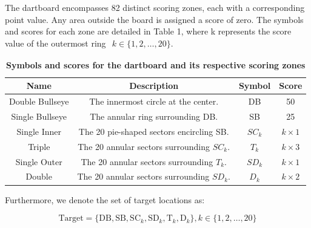 \documentclass[cjjs]{ipart}
\theoremstyle{plain}
\begin{document}
The dartboard encompasses 82 distinct scoring zones, each with a corresponding point value. Any area outside the board is assigned a score of zero. The symbols and scores for each zone are detailed in Table 1, where k represents the score value of the outermost ring $\begin{aligned}k \in \{1, 2, \dots, 20\}.\end{aligned}$
\begin{table}[h]
    \centering
    \begin{tabular}{|c|c|c|c|}
        \hline
        Name & Description & Symbol & Score \\
        \hline
        Double Bullseye & The innermost circle at the center. & DB & 50 \\
        \hline
        Single Bullseye & The annular ring surrounding DB. & SB & 25 \\
        \hline
        Single Inner & The 20 pie-shaped sectors encircling SB. & \( SC_k \) & \( k \times 1 \) \\
        \hline
        Triple & The 20 annular sectors surrounding \( SC_k \). & \( T_k \) & \( k \times 3 \) \\
        \hline
        Single Outer & The 20 annular sectors surrounding \( T_k \). & \( SD_k \) & \( k \times 1 \) \\
        \hline
        Double & The 20 annular sectors surrounding \( SD_k \). & \( D_k \) & \( k \times 2 \) \\
        \hline
    \end{tabular}
    \caption{\textbf{Symbols and scores for the dartboard and its respective scoring zones}}
\end{table}

Furthermore, we denote the set of target locations as:

\[
\text{Target} = \{ \text{DB}, \text{SB}, \text{SC}_k, \text{SD}_k, \text{T}_k, \text{D}_k \}, k \in \{1, 2, \dots, 20\}
\]
\end{document}
